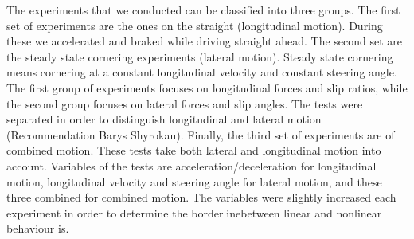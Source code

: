 The experiments that we conducted can be classified into three groups. The first set of experiments are the ones on the straight (longitudinal motion). During these we accelerated and braked while driving straight ahead. The second set are the steady state cornering experiments (lateral motion). Steady state cornering means cornering at a constant longitudinal velocity and constant steering angle. The first group of experiments focuses on longitudinal forces and slip ratios, while the second group focuses on lateral forces and slip angles. The tests were separated in order to distinguish longitudinal and lateral motion (Recommendation Barys Shyrokau). Finally, the third set of experiments are of combined motion. These tests take both lateral and longitudinal motion into account. 
	Variables of the tests are acceleration/deceleration for longitudinal motion, longitudinal velocity and steering angle for lateral motion, and these three combined for  combined motion. The variables were slightly increased each experiment in order to determine the \textquotesingle borderline\textquotesingle  between linear and nonlinear behaviour is. 

